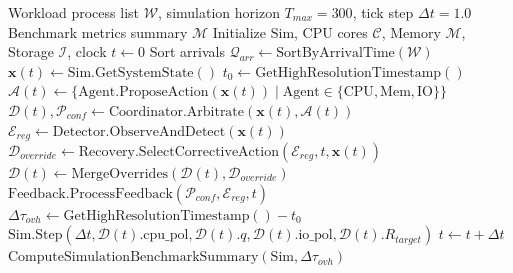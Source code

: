 \documentclass[conference]{IEEEtran}
\begin{document}
\begin{algorithm}[!t]
\caption{CoReOS Master Discrete-Event Simulation Loop}
\label{alg:sim_loop}
\begin{algorithmic}[1]
\REQUIRE Workload process list $\mathcal{W}$, simulation horizon $T_{max} = 300$, tick step $\Delta t = 1.0$
\ENSURE Benchmark metrics summary $\mathcal{M}$
\STATE Initialize $\text{Sim}$, CPU cores $\mathcal{C}$, Memory $\mathcal{M}$, Storage $\mathcal{I}$, clock $t \leftarrow 0$
\STATE Sort arrivals $\mathcal{Q}_{arr} \leftarrow \text{SortByArrivalTime}(\mathcal{W})$
    \STATE $\mathbf{x}(t) \leftarrow \text{Sim.GetSystemState}()$
    \STATE $t_0 \leftarrow \text{GetHighResolutionTimestamp}()$
    \STATE $\mathcal{A}(t) \leftarrow \{ \text{Agent}.\text{ProposeAction}(\mathbf{x}(t)) \mid \text{Agent} \in \{\text{CPU}, \text{Mem}, \text{IO}\} \}$
    \STATE $\mathcal{D}(t), \mathcal{P}_{conf} \leftarrow \text{Coordinator.Arbitrate}(\mathbf{x}(t), \mathcal{A}(t))$
    \STATE $\mathcal{E}_{reg} \leftarrow \text{Detector.ObserveAndDetect}(\mathbf{x}(t))$
        \STATE $\mathcal{D}_{override} \leftarrow \text{Recovery.SelectCorrectiveAction}(\mathcal{E}_{reg}, t, \mathbf{x}(t))$
        \STATE $\mathcal{D}(t) \leftarrow \text{MergeOverrides}(\mathcal{D}(t), \mathcal{D}_{override})$
    \ENDIF
    \STATE $\text{Feedback.ProcessFeedback}(\mathcal{P}_{conf}, \mathcal{E}_{reg}, t)$
    \STATE $\Delta \tau_{ovh} \leftarrow \text{GetHighResolutionTimestamp}() - t_0$
    \STATE $\text{Sim.Step}(\Delta t, \mathcal{D}(t).\text{cpu\_pol}, \mathcal{D}(t).q, \mathcal{D}(t).\text{io\_pol}, \mathcal{D}(t).R_{target})$
    \STATE $t \leftarrow t + \Delta t$
\ENDWHILE
\RETURN $\text{ComputeSimulationBenchmarkSummary}(\text{Sim}, \Delta \tau_{ovh})$
\end{algorithmic}
\end{algorithm}
\end{document}
